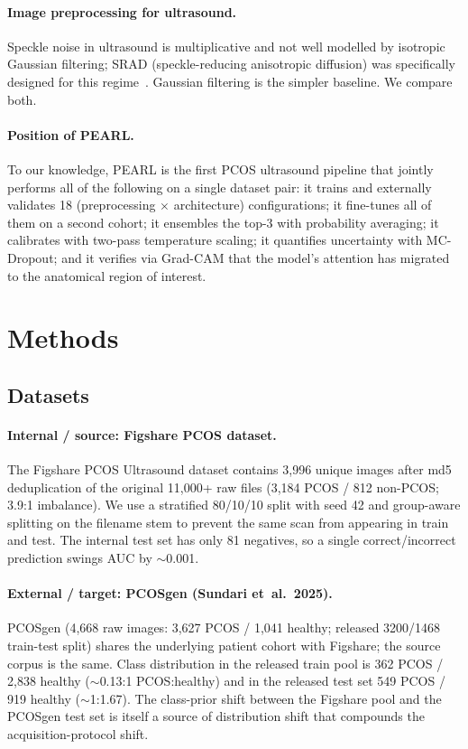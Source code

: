 \documentclass[11pt,twocolumn]{article}
\newcommand{\PCOS}{PCOS}
\newcommand{\PEARL}{PEARL}
\newcommand{\SRAD}{SRAD}
\newcommand{\AUC}{AUC}
\newcommand{\GradCAM}{Grad-CAM}
\begin{document}
\paragraph{Image preprocessing for ultrasound.}
Speckle noise in ultrasound is multiplicative and not well modelled by
isotropic Gaussian filtering; \SRAD{} (speckle-reducing anisotropic
diffusion) was specifically designed for this regime~\cite{yu2002}.
Gaussian filtering is the simpler baseline. We compare both.

\paragraph{Position of \PEARL{}.}
To our knowledge, \PEARL{} is the first \PCOS{} ultrasound pipeline that
jointly performs all of the following on a single dataset pair: it trains
and externally validates 18 (preprocessing $\times$ architecture)
configurations; it fine-tunes all of them on a second cohort; it
ensembles the top-3 with probability averaging; it calibrates with
two-pass temperature scaling; it quantifies uncertainty with MC-Dropout;
and it verifies via \GradCAM{} that the model's attention has migrated
to the anatomical region of interest.

\section{Methods}

\subsection{Datasets}

\paragraph{Internal / source: Figshare \PCOS{} dataset.}
The Figshare \PCOS{} Ultrasound dataset contains 3,996 unique images
after md5 deduplication of the original 11,000+ raw files (3,184 \PCOS{}
/ 812 non-\PCOS{}; 3.9:1 imbalance). We use a stratified 80/10/10 split
with seed 42 and group-aware splitting on the filename stem to prevent the
same scan from appearing in train and test. The internal test set has only
81 negatives, so a single correct/incorrect prediction swings \AUC{} by
$\sim$0.001.

\paragraph{External / target: \PCOS{}gen (Sundari et~al.\ 2025).}
\PCOS{}gen (4,668 raw images: 3,627 \PCOS{} / 1,041 healthy; released
3200/1468 train-test split) shares the underlying patient cohort with
Figshare; the source corpus is the same. Class distribution in the
released train pool is 362 \PCOS{} / 2,838 healthy ($\sim$0.13:1
\PCOS{:}healthy) and in the released test set 549 \PCOS{} / 919 healthy
($\sim$1:1.67). The class-prior shift between the Figshare pool and the
\PCOS{}gen test set is itself a source of distribution shift that
compounds the acquisition-protocol shift.
\end{document}
